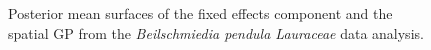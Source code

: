 \documentclass[]{interact}
\begin{document}
\begin{figure}[p]



\caption{Posterior mean surfaces of the fixed effects component and the
spatial GP from the \emph{Beilschmiedia pendula Lauraceae} data analysis.}
\label{beimean}
\end{figure}
\end{document}
